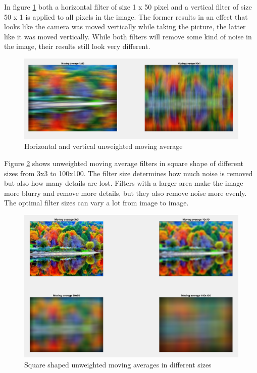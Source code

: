 \documentclass[11pt]{article}
\begin{document}
In figure \ref{fig:task9} both a horizontal filter of size 1 x 50 pixel and a vertical filter of size 50 x 1 is applied to all pixels in the image. The former results in an effect that looks like the camera was moved vertically while taking the picture, the latter like it was moved vertically. While both filters will remove some kind of noise in the image, their results still look very different. 

\begin{figure}[!hbt]
  \includegraphics[width=\textwidth]{task9}
  \caption{Horizontal and vertical unweighted moving average}
  \label{fig:task9}
\end{figure}

Figure \ref{fig:task10} shows unweighted moving average filters in square shape of different sizes from 3x3 to 100x100. The filter size determines how much noise is removed but also how many details are lost. Filters with a larger area make the image more blurry and remove more details, but they also remove noise more evenly. The optimal filter sizes can vary a lot from image to image.

\begin{figure}[!hbt]
  \includegraphics[width=\textwidth]{task10}
  \caption{Square shaped unweighted moving averages in different sizes}
  \label{fig:task10}
\end{figure}
\end{document}
